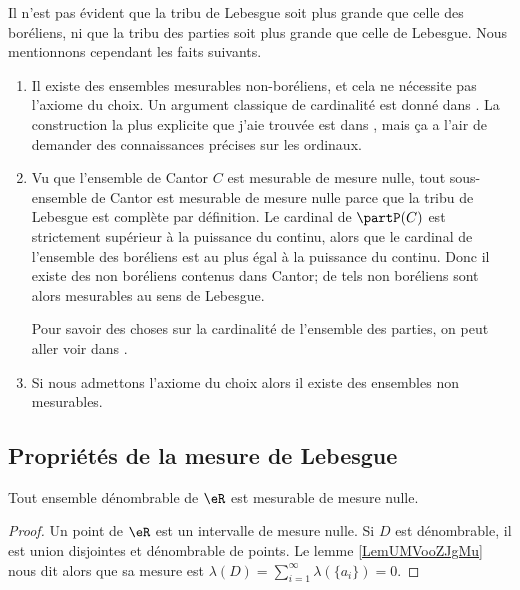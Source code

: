 \begin{remark}
    Il n'est pas évident que la tribu de Lebesgue soit plus grande que celle des boréliens, ni que la tribu des parties soit plus grande que celle de Lebesgue. Nous mentionnons cependant les faits suivants.
    \begin{enumerate}
        \item
            Il existe des ensembles mesurables non-boréliens, et cela ne nécessite pas l'axiome du choix. Un argument classique de cardinalité est donné dans \cite{SFYoobgQUp}. La construction la plus explicite que j'aie trouvée est dans \cite{XSHoosgoQa}, mais ça a l'air de demander des connaissances précises sur les ordinaux.
        \item
            Vu que l'ensemble de Cantor \( C\) est mesurable de mesure nulle, tout sous-ensemble de Cantor est mesurable de mesure nulle parce que la tribu de Lebesgue est complète par définition. Le cardinal de \( \partP(C)\) est strictement supérieur à la puissance du continu, alors que le cardinal de l'ensemble des boréliens est au plus égal à la puissance du continu. Donc il existe des non boréliens contenus dans Cantor; de tels non boréliens sont alors mesurables au sens de Lebesgue.

            Pour savoir des choses sur la cardinalité de l'ensemble des parties, on peut aller voir dans \cite{KZIoofzFLV}.
        \item
            Si nous admettons l'axiome du choix alors il existe des ensembles non mesurables.
    \end{enumerate}
\end{remark}

\subsection{Propriétés de la mesure de Lebesgue}

\begin{proposition}
    Tout ensemble dénombrable de \( \eR\) est mesurable de mesure nulle.
\end{proposition}

\begin{proof}
    Un point de \( \eR\) est un intervalle de mesure nulle. Si \( D\) est dénombrable, il est union disjointes et dénombrable de points. Le lemme \ref{LemUMVooZJgMu} nous dit alors que sa mesure est \( \lambda(D)=\sum_{i=1}^{\infty}\lambda(\{ a_i \})=0\).
\end{proof}

